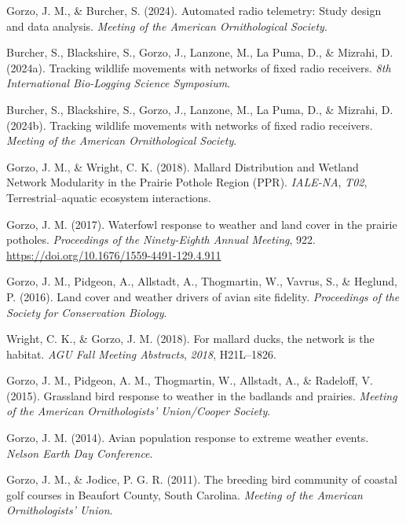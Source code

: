 \documentclass[11pt,a4paper,]{moderncv}
\newlength{\cslhangindent}
\newenvironment{CSLReferences}[2] %
 {\begin{list}{}{%
  \setlength{\itemindent}{0pt}
  \setlength{\leftmargin}{0pt}
  \setlength{\parsep}{0pt}
  \ifodd #1
   \setlength{\leftmargin}{\cslhangindent}
   \setlength{\itemindent}{-1\cslhangindent}
  \fi
  \setlength{\itemsep}{#2\baselineskip}}}
 {\end{list}}
\begin{document}
\label{refs-c9a32b88bbdb94f2a9a10d4107dff1d8}
\begin{CSLReferences}{1}{0}
Gorzo, J. M., \& Burcher, S. (2024). Automated radio telemetry: Study
design and data analysis. \emph{Meeting of the American Ornithological
Society}.

Burcher, S., Blackshire, S., Gorzo, J., Lanzone, M., La Puma, D., \&
Mizrahi, D. (2024a). Tracking wildlife movements with networks of fixed
radio receivers. \emph{8th International Bio-Logging Science Symposium}.

Burcher, S., Blackshire, S., Gorzo, J., Lanzone, M., La Puma, D., \&
Mizrahi, D. (2024b). Tracking wildlife movements with networks of fixed
radio receivers. \emph{Meeting of the American Ornithological Society}.

Gorzo, J. M., \& Wright, C. K. (2018). Mallard Distribution and Wetland
Network Modularity in the Prairie Pothole Region (PPR). \emph{IALE-NA},
\emph{T02}, Terrestrial--aquatic ecosystem interactions.

Gorzo, J. M. (2017). Waterfowl response to weather and land cover in the
prairie potholes. \emph{Proceedings of the Ninety-Eighth Annual
Meeting}, 922. \url{https://doi.org/10.1676/1559-4491-129.4.911}

Gorzo, J. M., Pidgeon, A., Allstadt, A., Thogmartin, W., Vavrus, S., \&
Heglund, P. (2016). Land cover and weather drivers of avian site
fidelity. \emph{Proceedings of the Society for Conservation Biology}.

Wright, C. K., \& Gorzo, J. M. (2018). For mallard ducks, the network is
the habitat. \emph{AGU Fall Meeting Abstracts}, \emph{2018}, H21L--1826.

Gorzo, J. M., Pidgeon, A. M., Thogmartin, W., Allstadt, A., \& Radeloff,
V. (2015). Grassland bird response to weather in the badlands and
prairies. \emph{Meeting of the American Ornithologists' Union/Cooper
Society}.

Gorzo, J. M. (2014). Avian population response to extreme weather
events. \emph{Nelson Earth Day Conference}.

Gorzo, J. M., \& Jodice, P. G. R. (2011). The breeding bird community of
coastal golf courses in Beaufort County, South Carolina. \emph{Meeting
of the American Ornithologists' Union}.


\end{CSLReferences}
\end{document}
